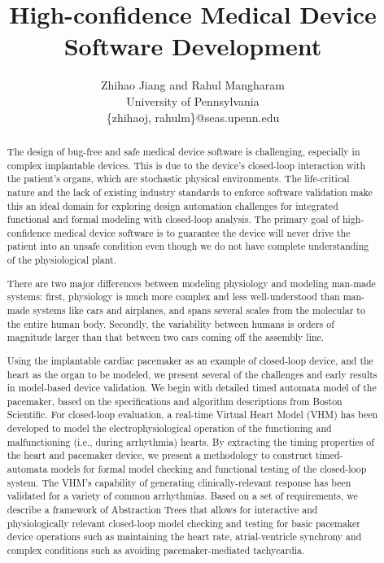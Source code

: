 \documentclass[openany]{now} %
\title{High-confidence Medical Device Software Development}
\author{
Zhihao Jiang and Rahul Mangharam \\
University of Pennsylvania\\
\{zhihaoj, rahulm\}@seas.upenn.edu
}
\begin{document}

\frontmatter  %

\maketitle

\tableofcontents

\mainmatter

\begin{abstract}
The design of bug-free and safe medical device software is challenging, especially in complex implantable devices. This is due to the device's closed-loop interaction with the patient's organs, which are stochastic physical environments. The life-critical nature and the lack of existing industry standards to enforce software validation make this an ideal domain for exploring design automation challenges for integrated functional and formal modeling with closed-loop analysis. The primary goal of high-confidence medical device software is to guarantee the device will never drive the patient into an unsafe condition even though we do not have complete understanding of the physiological plant.

There are two major differences between modeling physiology and modeling man-made systems:
first, physiology is much more complex and less well-understood than man-made systems like cars and airplanes, and spans several scales from the molecular to the entire human body.
Secondly, the variability between humans is orders of magnitude larger than that between two cars coming off the assembly line.

Using the implantable cardiac pacemaker as an example of closed-loop device, and the heart as the organ to be modeled, we present several of the challenges and early results in model-based device validation. We begin with detailed timed automata model of the pacemaker, based on the specifications and algorithm descriptions from Boston Scientific. For closed-loop evaluation, a real-time Virtual Heart Model (VHM) has been developed to model the electrophysiological operation of the functioning and malfunctioning (i.e., during arrhythmia) hearts. By extracting the timing properties of the heart and pacemaker device, we present a methodology to construct timed-automata models for formal model checking and functional testing of the closed-loop system. The VHM's capability of generating clinically-relevant response has been validated for a variety of common arrhythmias. Based on a set of requirements, we describe a framework of Abstraction Trees that allows for interactive and physiologically relevant closed-loop model checking and testing for basic pacemaker device operations such as maintaining the heart rate, atrial-ventricle synchrony and complex conditions such as avoiding pacemaker-mediated tachycardia. 


\end{abstract}
\end{document}
